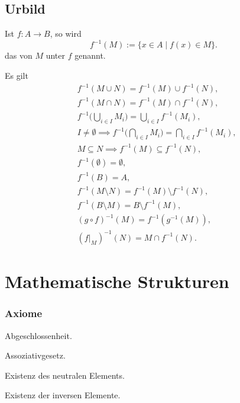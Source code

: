 \subsection{Urbild}
\begin{Definition}
Ist $f\colon A\to B$, so wird
\begin{equation}
f^{-1}(M) := \{x\in A\mid f(x)\in M\}.
\end{equation}
das  von $M$ unter $f$ genannt.
\end{Definition}
Es gilt
\begin{align}
& f^{-1}(M\cup N) = f^{-1}(M)\cup f^{-1}(N),\\
& f^{-1}(M\cap N) = f^{-1}(M)\cap f^{-1}(N),\\
& f^{-1}\Big(\bigcup_{i\in I}M_i\Big) = \bigcup_{i\in I} f^{-1}(M_i),\\
& I\ne\emptyset\implies f^{-1}\Big(\bigcap_{i\in I} M_i\Big) = \bigcap_{i\in I}f^{-1}(M_i),\\
& M\subseteq N\implies f^{-1}(M)\subseteq f^{-1}(N),\\
& f^{-1}(\emptyset) = \emptyset,\\
& f^{-1}(B) = A,\\
& f^{-1}(M\setminus N) = f^{-1}(M)\setminus f^{-1}(N),\\
& f^{-1}(B\setminus M) = B\setminus f^{-1}(M),\\
& (g\circ f)^{-1}(M) = f^{-1}(g^{-1}(M)),\\
& (f|_M)^{-1}(N) = M\cap f^{-1}(N).
\end{align}

\newpage
\section{Mathematische Strukturen}\label{sec:Strukturen}
\subsubsection*{Axiome}

\noindent{} Abgeschlossenheit.

\noindent{} Assoziativgesetz.

\noindent{} Existenz des neutralen Elements.

\noindent{} Existenz der inversen Elemente.

